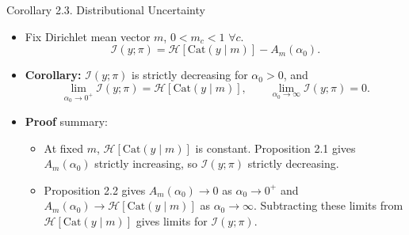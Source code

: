 \begin{frame}{Corollary 2.3. Distributional Uncertainty}
\label{frm:backup-distributional-monotonicity}
\begin{itemize}
\setlength{\itemsep}{4mm}
\item Fix Dirichlet mean vector $m$, $0<m_c<1$ $\forall c$.
\[
\mathcal I(y;\pi)=\mathcal H[\mathrm{Cat}(y\mid m)]-A_m(\alpha_0).
\]
\item \textbf{Corollary:} $\mathcal I(y;\pi)$ is strictly decreasing for $\alpha_0>0$, and
\[
\lim_{\alpha_0\to0^+}\mathcal I(y;\pi)=\mathcal H[\mathrm{Cat}(y\mid m)],
\qquad
\lim_{\alpha_0\to\infty}\mathcal I(y;\pi)=0.
\]
\item \textbf{Proof} summary:
\begin{itemize}
\item At fixed $m$, $\mathcal H[\mathrm{Cat}(y\mid m)]$ is constant.
Proposition 2.1 gives $A_m(\alpha_0)$ strictly increasing, so $\mathcal I(y;\pi)$ strictly decreasing.
\item Proposition 2.2 gives $A_m(\alpha_0)\to0$ as $\alpha_0\to0^+$ and
$A_m(\alpha_0)\to\mathcal H[\mathrm{Cat}(y\mid m)]$ as $\alpha_0\to\infty$.
Subtracting these limits from $\mathcal H[\mathrm{Cat}(y\mid m)]$ gives limits for $\mathcal I(y;\pi)$.
\end{itemize}
\end{itemize}
\end{frame}



